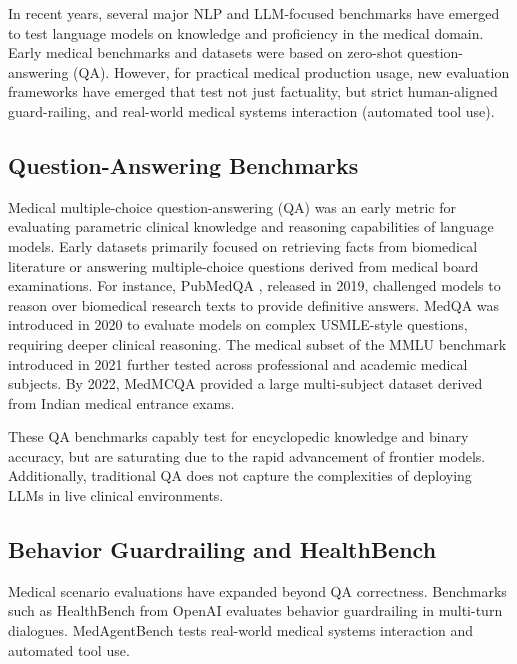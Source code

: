 \documentclass[conference]{IEEEtran}
\begin{document}
In recent years, several major NLP and LLM-focused benchmarks have emerged to test language models on knowledge and proficiency in the medical domain. Early medical benchmarks and datasets were based on zero-shot question-answering (QA). However, for practical medical production usage, new evaluation frameworks have emerged that test not just factuality, but strict human-aligned guard-railing, and real-world medical systems interaction (automated tool use).

\subsection{Question-Answering Benchmarks}

Medical multiple-choice question-answering (QA) was an early metric for evaluating parametric clinical knowledge and reasoning capabilities of language models. Early datasets primarily focused on retrieving facts from biomedical literature or answering multiple-choice questions derived from medical board examinations. For instance, PubMedQA \cite{jin2019pubmedqadatasetbiomedicalresearch}, released in 2019, challenged models to reason over biomedical research texts to provide definitive answers. MedQA \cite{jin2020diseasedoespatienthave} was introduced in 2020 to evaluate models on complex USMLE-style questions, requiring deeper clinical reasoning. The medical subset of the MMLU benchmark introduced in 2021 \cite{hendrycks2021measuringmassivemultitasklanguage} further tested across professional and academic medical subjects. By 2022, MedMCQA \cite{pal2022medmcqalargescalemultisubject} provided a large multi-subject dataset derived from Indian medical entrance exams. 

These QA benchmarks capably test for encyclopedic knowledge and binary accuracy, but are saturating due to the rapid advancement of frontier models. Additionally, traditional QA does not capture the complexities of deploying LLMs in live clinical environments.

\subsection{Behavior Guardrailing and HealthBench}

Medical scenario evaluations have expanded beyond QA correctness. Benchmarks such as HealthBench from OpenAI \cite{arora2025healthbenchevaluatinglargelanguage} evaluates behavior guardrailing in multi-turn dialogues. MedAgentBench \cite{jiang2025medagentbenchrealisticvirtualehr} tests real-world medical systems interaction and automated tool use. 
\end{document}
